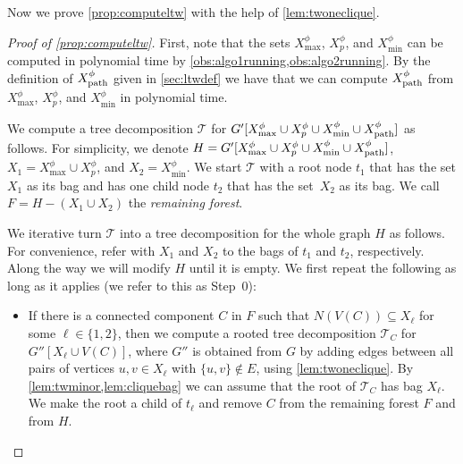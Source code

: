 \documentclass[a4paper,UKenglish,cleveref, autoref, thm-restate, numberwithinsect]{lipics-v2021}
\newcommand{\dpath}{\textup{path}}
\begin{document}
Now we prove \cref{prop:computeltw} with the help of \cref{lem:twoneclique}.



\begin{proof}[Proof of \cref{prop:computeltw}]
First, note that the sets $X^\phi_{\max}$, $X^\phi_p$, and $X^\phi_{\min}$ can be computed in polynomial time by \cref{obs:algo1running,obs:algo2running}. By the definition of $X^\phi_{\dpath}$ given in \cref{sec:ltwdef} we have that we can compute $X^\phi_{\dpath}$ from $X^\phi_{\max}$, $X^\phi_p$, and $X^\phi_{\min}$ in polynomial time.

We compute a tree decomposition $\mathcal{T}$ for $G'[X^\phi_{\max}\cup X^\phi_p\cup X^\phi_{\min}\cup X^\phi_{\dpath}]$ as follows. 
For simplicity, we denote $H=G'[X^\phi_{\max}\cup X^\phi_p\cup X^\phi_{\min}\cup X^\phi_{\dpath}]$, $X_1=X^\phi_{\max}\cup X^\phi_p$, and $X_2=X^\phi_{\min}$.
We start $\mathcal{T}$ with a root node $t_1$ that has the set $X_1$ as its bag and has one child node $t_2$ that has the set~$X_2$ as its bag. We call $F=H-(X_1\cup X_2)$ the \emph{remaining forest}. 




We iterative turn $\mathcal{T}$ into a tree decomposition for the whole graph $H$ as follows.
For convenience, refer with $X_1$ and $X_2$ to the bags of $t_1$ and $t_2$, respectively. Along the way we will modify $H$ until it is empty. 
We first repeat the following as long as it applies (we refer to this as Step~0):
\begin{itemize}
\item If there is a connected component $C$ in $F$ such that $N(V(C))\subseteq X_\ell$ for some $\ell\in\{1,2\}$, then we compute a rooted tree decomposition $\mathcal{T}_C$ for $G''[X_\ell\cup V(C)]$, where $G''$ is obtained from $G$ by adding edges between all pairs of vertices $u,v\in  X_\ell$ with $\{u,v\}\notin E$, using \cref{lem:twoneclique}. By \cref{lem:twminor,lem:cliquebag} we can assume that the root of $\mathcal{T}_C$ has bag $X_\ell$. We make the root a child of $t_\ell$ and remove $C$ from the remaining forest $F$ and from $H$.


\end{itemize}
\end{proof}
\end{document}

